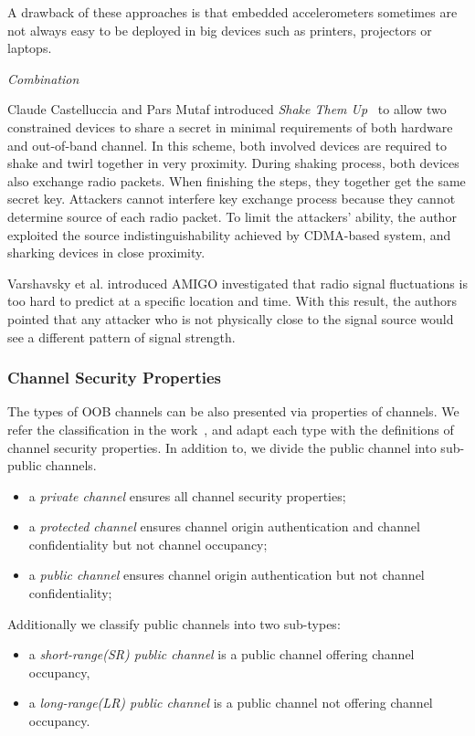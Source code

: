 A drawback of these approaches is that embedded accelerometers sometimes are not always easy to be deployed in big devices such as printers, projectors or laptops.

\emph{Combination}

Claude Castelluccia and Pars Mutaf introduced \emph{Shake Them Up}~\cite{Castelluccia:2005} to allow two constrained devices to share a secret in minimal requirements of both hardware and out-of-band channel. In this scheme, both involved devices are required to shake and twirl together in very proximity. During shaking process, both devices also exchange radio packets. When finishing the steps, they together get the same secret key. Attackers cannot interfere key exchange process because they cannot determine source of each radio packet. To limit the attackers' ability, the author exploited the source indistinguishability achieved by CDMA-based system, and sharking devices in close proximity. 

Varshavsky et al. introduced AMIGO \cite{Scannell07amigo:proximity-based} investigated that radio signal fluctuations is too hard to predict at a specific location and time. With this result, the authors pointed that any attacker who is not physically close to the signal source would see a different pattern of signal strength. 

\subsubsection{Channel Security Properties}

The types of OOB channels can be also presented via properties of channels. We refer the classification in the work~\cite{6687314}, and adapt each type with the definitions of channel security properties. In addition to, we divide the public channel into sub-public channels. 
\begin{itemize}
 \item a \textit{private channel} ensures all channel security properties;
 \item a \textit{protected channel} ensures channel origin authentication and channel confidentiality but not channel occupancy;
 \item a \textit{public channel} ensures channel origin authentication but not channel confidentiality;
\end{itemize}

Additionally we classify public channels into two sub-types: 
\begin{itemize}
 \item a \textit{short-range(SR) public channel} is a public channel offering channel occupancy,
 \item a \textit{long-range(LR) public channel} is a public channel not offering channel occupancy.
\end{itemize}

